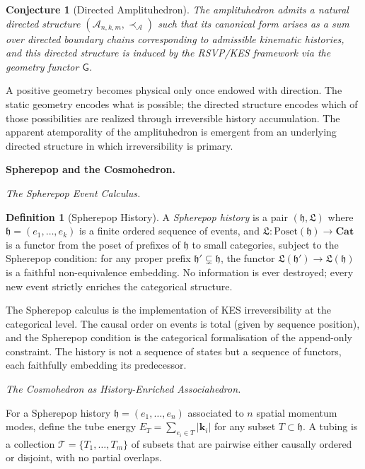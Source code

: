 \documentclass[11pt]{article}
\theoremstyle{plain}
\newtheorem{conjecture}[theorem]{Conjecture}
\theoremstyle{definition}
\newtheorem{definition}[theorem]{Definition}
\theoremstyle{remark}
\newcommand{\hist}{\mathfrak{h}}
\newcommand{\Log}{\mathfrak{L}}
\newcommand{\Gfun}{\mathsf{G}}
\begin{document}
\begin{conjecture}[Directed Amplituhedron]
\label{conj:directed-amplituhedron}
The amplituhedron admits a natural directed structure $(\mathcal{A}_{n,k,m}, \prec_{\mathcal{A}})$ such that its canonical form arises as a sum over directed boundary chains corresponding to admissible kinematic histories, and this directed structure is induced by the RSVP/KES framework via the geometry functor $\Gfun$.
\end{conjecture}

A positive geometry becomes physical only once endowed with direction. The static geometry encodes what is possible; the directed structure encodes which of those possibilities are realized through irreversible history accumulation. The apparent atemporality of the amplituhedron is emergent from an underlying directed structure in which irreversibility is primary.

\bigskip\noindent\textbf{Spherepop and the Cosmohedron.}
\label{sec:spherepop}

\medskip\noindent\textit{The Spherepop Event Calculus.}

\begin{definition}[Spherepop History]
A \emph{Spherepop history} is a pair $(\hist, \Log)$ where $\hist = (e_1, \ldots, e_k)$ is a finite ordered sequence of events, and $\Log: \mathrm{Poset}(\hist) \to \mathbf{Cat}$ is a functor from the poset of prefixes of $\hist$ to small categories, subject to the Spherepop condition: for any proper prefix $\hist' \subsetneq \hist$, the functor $\Log(\hist') \to \Log(\hist)$ is a faithful non-equivalence embedding. No information is ever destroyed; every new event strictly enriches the categorical structure.
\end{definition}

The Spherepop calculus is the implementation of KES irreversibility at the categorical level. The causal order on events is total (given by sequence position), and the Spherepop condition is the categorical formalisation of the append-only constraint. The history is not a sequence of states but a sequence of functors, each faithfully embedding its predecessor.

\medskip\noindent\textit{The Cosmohedron as History-Enriched Associahedron.}

For a Spherepop history $\hist = (e_1, \ldots, e_n)$ associated to $n$ spatial momentum modes, define the tube energy $E_T = \sum_{e_i \in T} |\mathbf{k}_i|$ for any subset $T \subset \hist$. A tubing is a collection $\mathcal{T} = \{T_1, \ldots, T_m\}$ of subsets that are pairwise either causally ordered or disjoint, with no partial overlaps.
\end{document}
